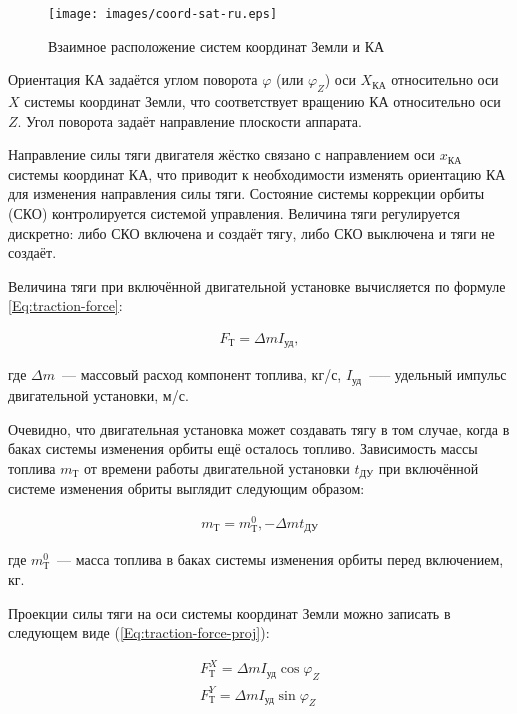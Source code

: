 \documentclass[12pt,a4paper]{article}
\begin{document}
\begin{figure}[tbh]
  \begin{center}
    \texttt{[image: images/coord-sat-ru.eps]}
    \caption{Взаимное расположение систем координат Земли и КА}
    \label{Pic:Coord-Sat}
  \end{center}
\end{figure}

Ориентация КА задаётся углом поворота $\varphi$ (или $\varphi_Z$) оси $X_{\text{КА}}$ относительно оси $X$ системы координат
Земли, что соответствует вращению КА относительно оси $Z$. Угол поворота задаёт направление
плоскости аппарата.

Направление силы тяги двигателя жёстко связано с направлением оси $x_{\text{КА}}$ системы
координат КА, что приводит к необходимости изменять ориентацию КА для изменения
направления силы тяги. Состояние системы коррекции орбиты (СКО) контролируется системой
управления. Величина тяги регулируется дискретно: либо СКО включена и создаёт тягу, либо
СКО выключена и тяги не создаёт.

Величина тяги при включённой двигательной установке вычисляется по формуле
\ref{Eq:traction-force}:

\begin{eqnarray}
  F_{\text{Т}} = \Delta m I_{\text{уд}}, \label{Eq:traction-force}
\end{eqnarray}

где $\Delta m$~--– массовый расход компонент топлива, кг/с, $I_{\text{уд}}$~---– удельный
импульс двигательной установки, м/с.

Очевидно, что двигательная установка может создавать тягу в том случае, когда в баках
системы изменения орбиты ещё осталось топливо. Зависимость массы топлива $m_{\text{Т}}$ от времени
работы двигательной установки $t_{\text{ДУ}}$ при включённой системе изменения обриты выглядит
следующим образом:

\begin{eqnarray}
  m_{\text{Т}} = m_{\text{Т}}^0, - \Delta m t_{\text{ДУ}}
\end{eqnarray}

где $m_{\text{Т}}^0$~--– масса топлива в баках системы изменения орбиты перед включением,
кг.

Проекции силы тяги на оси системы координат Земли можно записать в следующем виде
(\ref{Eq:traction-force-proj}):

\begin{eqnarray}
  F_{\text{Т}}^X = \Delta m I_{\text{уд}} \cos{\varphi_Z} \nonumber \\
  F_{\text{Т}}^Y = \Delta m I_{\text{уд}} \sin{\varphi_Z} \label{Eq:traction-force-proj}
\end{eqnarray}
\end{document}

